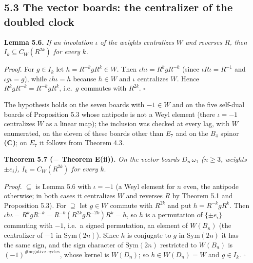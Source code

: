\documentclass[
]{article}
\begin{document}
\subsection{5.3 The vector boards: the centralizer of the doubled
clock}\label{the-vector-boards-the-centralizer-of-the-doubled-clock}

\textbf{Lemma 5.6.} \emph{If an involution \(\iota\) of the weights
centralizes \(W\) and reverses \(R\), then \(I_k \subseteq C_W(R^{2k})\)
for every \(k\).}

\emph{Proof.} For \(g \in I_k\) let \(h = R^{-k}gR^k \in W\). Then
\(\iota h \iota = R^{k} g R^{-k}\) (since \(\iota R \iota = R^{-1}\) and
\(\iota g \iota = g\)), while \(\iota h \iota = h\) because \(h \in W\)
and \(\iota\) centralizes \(W\). Hence \(R^kgR^{-k} = R^{-k}gR^k\),
i.e.~\(g\) commutes with \(R^{2k}\). \(\square\)

The hypothesis holds on the seven boards with \(-1 \in W\) and on the
five self-dual boards of Proposition 5.3 whose antipode is not a Weyl
element (there \(\iota = -1\) centralizes \(W\) as a linear map); the
inclusion was checked at every lag, with \(W\) enumerated, on the eleven
of these boards other than \(E_7\) and on the \(B_4\) spinor
\textbf{(C)}; on \(E_7\) it follows from Theorem 4.3.

\textbf{Theorem 5.7 (= Theorem E(ii)).} \emph{On the vector boards
\(D_n\,\omega_1\) (\(n \ge 3\), weights \(\pm e_i\)),
\(I_k = C_W(R^{2k})\) for every \(k\).}

\emph{Proof.} \(\subseteq\) is Lemma 5.6 with \(\iota = -1\) (a Weyl
element for \(n\) even, the antipode otherwise; in both cases it
centralizes \(W\) and reverses \(R\) by Theorem 5.1 and Proposition
5.3). For \(\supseteq\) let \(g \in W\) commute with \(R^{2k}\) and put
\(h = R^{-k}gR^k\). Then
\(\iota h \iota = R^{k}gR^{-k} = R^{-k}(R^{2k}gR^{-2k})R^{k} = h\), so
\(h\) is a permutation of \(\{\pm e_i\}\) commuting with \(-1\), i.e.~a
signed permutation, an element of \(W(B_n)\) (the centralizer of \(-1\)
in \(\mathrm{Sym}(2n)\)). Since \(h\) is conjugate to \(g\) in
\(\mathrm{Sym}(2n)\) it has the same sign, and the sign character of
\(\mathrm{Sym}(2n)\) restricted to \(W(B_n)\) is
\((-1)^{\#\text{negative cycles}}\), whose kernel is \(W(D_n)\); so
\(h \in W(D_n) = W\) and \(g \in I_k\). \(\square\)
\end{document}
